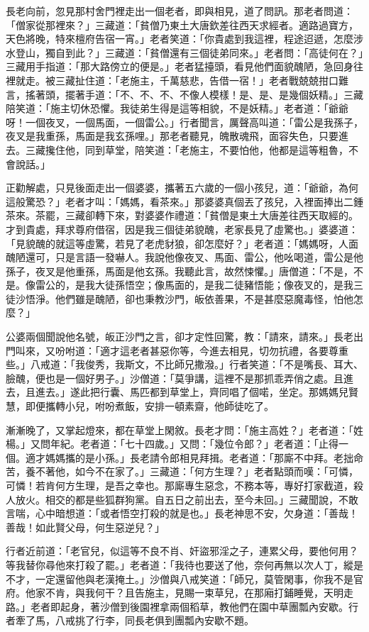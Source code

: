 長老向前，忽見那村舍門裡走出一個老者，即與相見，道了問訊。那老者問道：「僧家從那裡來？」三藏道：「貧僧乃東土大唐欽差往西天求經者。適路過寶方，天色將晚，特來檀府告宿一宵。」老者笑道：「你貴處到我這裡，程途迢遞，怎麼涉水登山，獨自到此？」三藏道：「貧僧還有三個徒弟同來。」老者問：「高徒何在？」三藏用手指道：「那大路傍立的便是。」老者猛擡頭，看見他們面貌醜陋，急回身往裡就走。被三藏扯住道：「老施主，千萬慈悲，告借一宿！」老者戰兢兢拑口難言，搖著頭，擺著手道：「不、不、不、不像人模樣！是、是、是幾個妖精。」三藏陪笑道：「施主切休恐懼。我徒弟生得是這等相貌，不是妖精。」老者道：「爺爺呀！一個夜叉，一個馬面，一個雷公。」行者聞言，厲聲高叫道：「雷公是我孫子，夜叉是我重孫，馬面是我玄孫哩。」那老者聽見，魄散魂飛，面容失色，只要進去。三藏攙住他，同到草堂，陪笑道：「老施主，不要怕他，他都是這等粗魯，不會說話。」

正勸解處，只見後面走出一個婆婆，攜著五六歲的一個小孩兒，道：「爺爺，為何這般驚恐？」老者才叫：「媽媽，看茶來。」那婆婆真個丟了孩兒，入裡面捧出二鍾茶來。茶罷，三藏卻轉下來，對婆婆作禮道：「貧僧是東土大唐差往西天取經的。才到貴處，拜求尊府借宿，因是我三個徒弟貌醜，老家長見了虛驚也。」婆婆道：「見貌醜的就這等虛驚，若見了老虎豺狼，卻怎麼好？」老者道：「媽媽呀，人面醜陋還可，只是言語一發嚇人。我說他像夜叉、馬面、雷公，他吆喝道，雷公是他孫子，夜叉是他重孫，馬面是他玄孫。我聽此言，故然悚懼。」唐僧道：「不是，不是。像雷公的，是我大徒孫悟空；像馬面的，是我二徒豬悟能；像夜叉的，是我三徒沙悟淨。他們雖是醜陋，卻也秉教沙門，皈依善果，不是甚麼惡魔毒怪，怕他怎麼？」

公婆兩個聞說他名號，皈正沙門之言，卻才定性回驚，教：「請來，請來。」長老出門叫來，又吩咐道：「適才這老者甚惡你等，今進去相見，切勿抗禮，各要尊重些。」八戒道：「我俊秀，我斯文，不比師兄撒潑。」行者笑道：「不是嘴長、耳大、臉醜，便也是一個好男子。」沙僧道：「莫爭講，這裡不是那抓乖弄俏之處。且進去，且進去。」遂此把行囊、馬匹都到草堂上，齊同唱了個喏，坐定。那媽媽兒賢慧，即便攜轉小兒，咐吩煮飯，安排一頓素齋，他師徒吃了。

漸漸晚了，又掌起燈來，都在草堂上閑敘。長老才問：「施主高姓？」老者道：「姓楊。」又問年紀。老者道：「七十四歲。」又問：「幾位令郎？」老者道：「止得一個。適才媽媽攜的是小孫。」長老請令郎相見拜揖。老者道：「那廝不中拜。老拙命苦，養不著他，如今不在家了。」三藏道：「何方生理？」老者點頭而嘆：「可憐，可憐！若肯何方生理，是吾之幸也。那廝專生惡念，不務本等，專好打家截道，殺人放火。相交的都是些狐群狗黨。自五日之前出去，至今未回。」三藏聞說，不敢言喘，心中暗想道：「或者悟空打殺的就是也。」長老神思不安，欠身道：「善哉！善哉！如此賢父母，何生惡逆兒？」

行者近前道：「老官兒，似這等不良不肖、奸盜邪淫之子，連累父母，要他何用？等我替你尋他來打殺了罷。」老者道：「我待也要送了他，奈何再無以次人丁，縱是不才，一定還留他與老漢掩土。」沙僧與八戒笑道：「師兄，莫管閑事，你我不是官府。他家不肯，與我何干？且告施主，見賜一束草兒，在那廂打鋪睡覺，天明走路。」老者即起身，著沙僧到後園裡拿兩個稻草，教他們在園中草團瓢內安歇。行者牽了馬，八戒挑了行李，同長老俱到團瓢內安歇不題。


